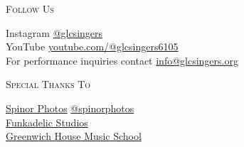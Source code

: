 \documentclass{article}[10pt]
\begin{document}
\begin{titlepage}
\begin{center}
\begin{minipage}{4in}
\begin{center}
{\large{\textsc{Follow Us}}}

Instagram \href{https://www.instagram.com/glcsingers/}{@glcsingers}\\
YouTube \href{https://www.youtube.com/@glcsingers6105/featured}{youtube.com/@glcsingers6105}\\
For performance inquiries contact \href{info@glcsingers.org}{info@glcsingers.org}
\end{center}

\begin{center}
{\large{\textsc{Special Thanks To}}}

\href{https://www.spinorphotos.com/}{Spinor Photos}
    \href{https://www.instagram.com/spinorphotos}{@spinorphotos}\\
\href{https://www.funkadelicstudios.com/}{Funkadelic Studios}\\
\href{https://www.youtube.com/@glcsingers6105/featured}{Greenwich House Music School}
\end{center}

\end{minipage}

\end{center}
\end{titlepage}
\end{document}
